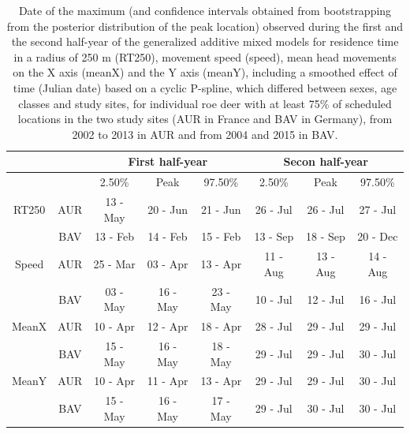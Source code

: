 \documentclass[a4paper,11pt]{article}
\begin{document}
\newpage
\begin{table}[ht]
  \centering
  \caption{Date of the maximum (and confidence intervals obtained from bootstrapping from the posterior distribution of the peak location) observed during the first and the second half-year of the generalized additive
    mixed models for residence time in a radius of 250 m (RT250),
    movement speed (speed), mean head movements on the X axis (meanX)
    and the Y axis (meanY), including a smoothed effect of time
    (Julian date) based on a cyclic P-spline, which differed between sexes, age classes and study sites, for individual roe deer with at least 75\% of scheduled locations in the two study sites (AUR in France and BAV in Germany), from 2002
    to 2013 in AUR and from 2004 and 2015 in BAV.}    \label{tab:peaks}
    
    \begin{tabular}{cccccccc}
    \\
    \hline
          &       & \multicolumn{3}{c}{First half-year} & \multicolumn{3}{c}{Secon half-year} \\
    \hline
          &       & 2.50\% & Peak  & 97.50\% & 2.50\% & Peak  & 97.50\% \\
    RT250 & AUR   & 13 - May & 20 - Jun & 21 - Jun & 26 - Jul & 26 - Jul & 27 - Jul \\
          & BAV   & 13 - Feb & 14 - Feb & 15 - Feb & 13 - Sep & 18 - Sep & 20 - Dec \\
    Speed & AUR   & 25 - Mar & 03 - Apr & 13 - Apr & 11 - Aug & 13 - Aug & 14 - Aug       \\
          & BAV   & 03 - May & 16 - May & 23 - May & 10 - Jul & 12 - Jul & 16 - Jul \\
    MeanX & AUR   & 10 - Apr & 12 - Apr & 18 - Apr & 28 - Jul & 29 - Jul & 29 - Jul \\
          & BAV   & 15 - May & 16 - May & 18 - May & 29 - Jul & 29 - Jul & 30 - Jul \\
    MeanY & AUR   & 10 - Apr & 11 - Apr & 13 - Apr & 29 - Jul & 29 - Jul & 30 - Jul \\
          & BAV   & 15 - May & 16 - May & 17 - May & 29 - Jul & 30 - Jul & 30 - Jul \\
    \hline
    \end{tabular}
\end{table}

\end{document}
